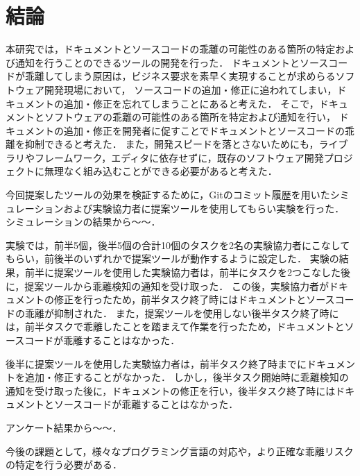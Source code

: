 \chapter{結論}
本研究では，ドキュメントとソースコードの乖離の可能性のある箇所の特定および通知を行うことのできるツールの開発を行った．
ドキュメントとソースコードが乖離してしまう原因は，ビジネス要求を素早く実現することが求めらるソフトウェア開発現場において，
ソースコードの追加・修正に追われてしまい，ドキュメントの追加・修正を忘れてしまうことにあると考えた．
そこで，ドキュメントとソフトウェアの乖離の可能性のある箇所を特定および通知を行い，
ドキュメントの追加・修正を開発者に促すことでドキュメントとソースコードの乖離を抑制できると考えた．
また，開発スピードを落とさないためにも，ライブラリやフレームワーク，エディタに依存せずに，既存のソフトウェア開発プロジェクトに無理なく組み込むことができる必要があると考えた．

今回提案したツールの効果を検証するために，Gitのコミット履歴を用いたシミュレーションおよび実験協力者に提案ツールを使用してもらい実験を行った．
シミュレーションの結果から〜〜．

実験では，前半5個，後半5個の合計10個のタスクを2名の実験協力者にこなしてもらい，前後半のいずれかで提案ツールが動作するように設定した．
実験の結果，前半に提案ツールを使用した実験協力者は，前半にタスクを2つこなした後に，提案ツールから乖離検知の通知を受け取った．
この後，実験協力者がドキュメントの修正を行ったため，前半タスク終了時にはドキュメントとソースコードの乖離が抑制された．
また，提案ツールを使用しない後半タスク終了時には，前半タスクで乖離したことを踏まえて作業を行ったため，ドキュメントとソースコードが乖離することはなかった．

後半に提案ツールを使用した実験協力者は，前半タスク終了時までにドキュメントを追加・修正することがなかった．
しかし，後半タスク開始時に乖離検知の通知を受け取った後に，ドキュメントの修正を行い，後半タスク終了時にはドキュメントとソースコードが乖離することはなかった．

アンケート結果から〜〜．

今後の課題として，様々なプログラミング言語の対応や，より正確な乖離リスクの特定を行う必要がある．